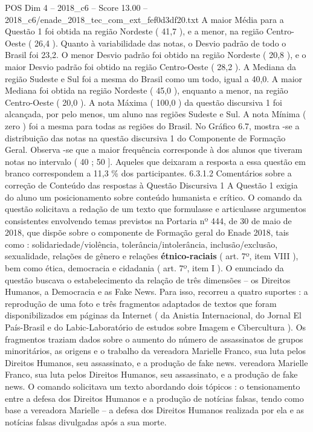 \begin{textsample}{POS Dim 4 – 2018\_c6 – Score 13.00 – 2018\_c6/enade\_2018\_tec\_com\_ext\_fef0d3df20.txt}
A maior Média para a Questão 1 foi obtida na região Nordeste ( 41,7 ), e a menor, na região Centro-Oeste ( 26,4 ).
Quanto à variabilidade das notas, o Desvio padrão de todo o Brasil foi 23,2.
O menor Desvio padrão foi obtido na região Nordeste ( 20,8 ), e o maior Desvio padrão foi obtido na região Centro-Oeste ( 28,2 ).
A Mediana da região Sudeste e Sul foi a mesma do Brasil como um todo, igual a 40,0.
A maior Mediana foi obtida na região Nordeste ( 45,0 ), enquanto a menor, na região Centro-Oeste ( 20,0 ).
A nota Máxima ( 100,0 ) da questão discursiva 1 foi alcançada, por pelo menos, um aluno nas regiões Sudeste e Sul.
A nota Mínima ( zero ) foi a mesma para todas as regiões do Brasil.
No Gráfico 6.7, mostra -se a distribuição das notas na questão discursiva 1 do Componente de Formação Geral.
Observa -se que a maior frequência corresponde à dos alunos que tiveram notas no intervalo ( 40 ; 50 ].
Aqueles que deixaram a resposta a essa questão em branco correspondem a 11,3 \% dos participantes. 6.3.1.2 Comentários sobre a correção de Conteúdo das respostas à Questão Discursiva 1 A Questão 1 exigia do aluno um posicionamento sobre conteúdo humanista e crítico.
O comando da questão solicitava a redação de um texto que formulasse e articulasse argumentos consistentes envolvendo temas previstos na Portaria nº 444, de 30 de maio de 2018, que dispõe sobre o componente de Formação geral do Enade 2018, tais como : solidariedade/violência, tolerância/intolerância, inclusão/exclusão, sexualidade, relações de gênero e relações \textbf{étnico-raciais} ( art. 7º, item VIII ), bem como ética, democracia e cidadania ( art. 7º, item I ).
O enunciado da questão buscava o estabelecimento da relação de três dimensões – os Direitos Humanos, a Democracia e as Fake News.
Para isso, recorreu a quatro suportes : a reprodução de uma foto e três fragmentos adaptados de textos que foram disponibilizados em páginas da Internet ( da Anistia Internacional, do Jornal El País-Brasil e do Labic-Laboratório de estudos sobre Imagem e Cibercultura ).
Os fragmentos traziam dados sobre o aumento do número de assassinatos de grupos minoritários, as origens e o trabalho da vereadora Marielle Franco, sua luta pelos Direitos Humanos, seu assassinato, e a produção de fake news. vereadora Marielle Franco, sua luta pelos Direitos Humanos, seu assassinato, e a produção de fake news.
O comando solicitava um texto abordando dois tópicos : o tensionamento entre a defesa dos Direitos Humanos e a produção de notícias falsas, tendo como base a vereadora Marielle – a defesa dos Direitos Humanos realizada por ela e as notícias falsas divulgadas após a sua morte.

\end{textsample}

